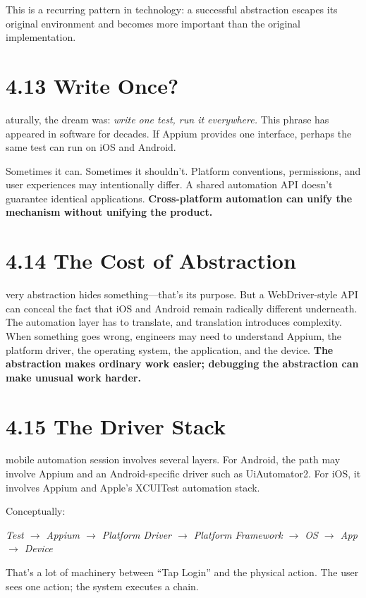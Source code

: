 \documentclass[11pt, a4paper, openany]{book}
\newcommand{\initialcap}[1]{{\fontfamily{lmss}\selectfont\huge\textbf{#1}}}
\begin{document}
This is a recurring pattern in technology: a successful abstraction escapes its original environment and becomes more important than the original implementation.

\section{4.13 Write Once?}
\noindent \initialcap{N}aturally, the dream was: \textit{write one test, run it everywhere.} This phrase has appeared in software for decades. If Appium provides one interface, perhaps the same test can run on iOS and Android. 

Sometimes it can. Sometimes it shouldn't. Platform conventions, permissions, and user experiences may intentionally differ. A shared automation API doesn't guarantee identical applications. \textbf{Cross-platform automation can unify the mechanism without unifying the product.}

\section{4.14 The Cost of Abstraction}
\noindent \initialcap{E}very abstraction hides something---that's its purpose. But a WebDriver-style API can conceal the fact that iOS and Android remain radically different underneath. The automation layer has to translate, and translation introduces complexity. When something goes wrong, engineers may need to understand Appium, the platform driver, the operating system, the application, and the device. \textbf{The abstraction makes ordinary work easier; debugging the abstraction can make unusual work harder.}

\section{4.15 The Driver Stack}
\noindent \initialcap{A} mobile automation session involves several layers. For Android, the path may involve Appium and an Android-specific driver such as UiAutomator2. For iOS, it involves Appium and Apple's XCUITest automation stack. 

Conceptually:
\begin{center}
\textit{Test $\rightarrow$ Appium $\rightarrow$ Platform Driver $\rightarrow$ Platform Framework $\rightarrow$ OS $\rightarrow$ App $\rightarrow$ Device}
\end{center}
That's a lot of machinery between ``Tap Login'' and the physical action. The user sees one action; the system executes a chain.
\end{document}
